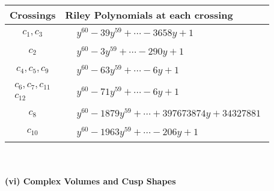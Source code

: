 \documentclass[1p]{elsarticle_modified}
\theoremstyle{definition}
\begin{document}
\begin{tabular}{m{50pt}|m{274pt}}
Crossings & \hspace{64pt}Riley Polynomials at each crossing \\
\hline $$\begin{aligned}c_{1},c_{3}\end{aligned}$$&$\begin{aligned}
&y^{60}-39 y^{59}+\cdots-3658 y+1
\end{aligned}$\\
\hline $$\begin{aligned}c_{2}\end{aligned}$$&$\begin{aligned}
&y^{60}-3 y^{59}+\cdots-290 y+1
\end{aligned}$\\
\hline $$\begin{aligned}c_{4},c_{5},c_{9}\end{aligned}$$&$\begin{aligned}
&y^{60}-63 y^{59}+\cdots-6 y+1
\end{aligned}$\\
\hline $$\begin{aligned}c_{6},c_{7},c_{11}\\c_{12}\end{aligned}$$&$\begin{aligned}
&y^{60}-71 y^{59}+\cdots-6 y+1
\end{aligned}$\\
\hline $$\begin{aligned}c_{8}\end{aligned}$$&$\begin{aligned}
&y^{60}-1879 y^{59}+\cdots+397673874 y+34327881
\end{aligned}$\\
\hline $$\begin{aligned}c_{10}\end{aligned}$$&$\begin{aligned}
&y^{60}-1963 y^{59}+\cdots-206 y+1
\end{aligned}$\\
\hline
\end{tabular}\\~\\
\newpage\flushleft \textbf{(vi) Complex Volumes and Cusp Shapes}
\end{document}
